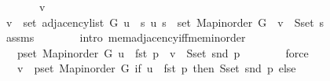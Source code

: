 \begin{isabellebody}
\endisataginvisible
{\isafoldinvisible}%
%
\isadeliminvisible
\isanewline
%
\endisadeliminvisible
%
\isadelimproof
%
\endisadelimproof
%
\isatagproof
{}\isamarkupfalse%
\ {\isacharminus}{\kern0pt}\isanewline
\ \ \isacommand{{\isacharbraceleft}{\kern0pt}}\isamarkupfalse%
\ \isamarkupfalse%
\ v\isanewline
\ \ \ \ \isamarkupfalse%
\ {\isachardoublequoteopen}v\ {\isasymin}\ set\ {\isacharparenleft}{\kern0pt}adjacency{\isacharunderscore}{\kern0pt}list\ G\ u{\isacharparenright}{\kern0pt}\ {\isasymlongleftrightarrow}\ {\isacharparenleft}{\kern0pt}{\isasymexists}s{\isachardot}{\kern0pt}\ {\isacharparenleft}{\kern0pt}u{\isacharcomma}{\kern0pt}\ s{\isacharparenright}{\kern0pt}\ {\isasymin}\ set\ {\isacharparenleft}{\kern0pt}Map{\isacharunderscore}{\kern0pt}inorder\ G{\isacharparenright}{\kern0pt}\ {\isasymand}\ v\ {\isasymin}\ S{\isachardot}{\kern0pt}set\ s{\isacharparenright}{\kern0pt}{\isachardoublequoteclose}\isanewline
\ \ \ \ \ \ \isamarkupfalse%
\ assms\isanewline
\ \ \ \ \ \ \isamarkupfalse%
\ {\isacharparenleft}{\kern0pt}intro\ mem{\isacharunderscore}{\kern0pt}adjacency{\isacharunderscore}{\kern0pt}iff{\isacharunderscore}{\kern0pt}mem{\isacharunderscore}{\kern0pt}inorder{\isacharparenright}{\kern0pt}\isanewline
\ \ \ \ \isamarkupfalse%
\ \isamarkupfalse%
\ {\isachardoublequoteopen}{\isachardot}{\kern0pt}{\isachardot}{\kern0pt}{\isachardot}{\kern0pt}\ {\isasymlongleftrightarrow}\ {\isacharparenleft}{\kern0pt}{\isasymexists}p{\isasymin}set\ {\isacharparenleft}{\kern0pt}Map{\isacharunderscore}{\kern0pt}inorder\ G{\isacharparenright}{\kern0pt}{\isachardot}{\kern0pt}\ u\ {\isacharequal}{\kern0pt}\ fst\ p\ {\isasymand}\ v\ {\isasymin}\ S{\isachardot}{\kern0pt}set\ {\isacharparenleft}{\kern0pt}snd\ p{\isacharparenright}{\kern0pt}{\isacharparenright}{\kern0pt}{\isachardoublequoteclose}\isanewline
\ \ \ \ \ \ \isamarkupfalse%
\ force\isanewline
\ \ \ \ \isamarkupfalse%
\ \isamarkupfalse%
\ {\isachardoublequoteopen}{\isachardot}{\kern0pt}{\isachardot}{\kern0pt}{\isachardot}{\kern0pt}\ {\isasymlongleftrightarrow}\ v\ {\isasymin}\ {\isacharparenleft}{\kern0pt}{\isasymUnion}p{\isasymin}set\ {\isacharparenleft}{\kern0pt}Map{\isacharunderscore}{\kern0pt}inorder\ G{\isacharparenright}{\kern0pt}{\isachardot}{\kern0pt}\ if\ u\ {\isacharequal}{\kern0pt}\ fst\ p\ then\ S{\isachardot}{\kern0pt}set\ {\isacharparenleft}{\kern0pt}snd\ p{\isacharparenright}{\kern0pt}\ else\ {\isacharbraceleft}{\kern0pt}{\isacharbraceright}{\kern0pt}{\isacharparenright}{\kern0pt}{\isachardoublequoteclose}\isanewline

\end{isabellebody}
